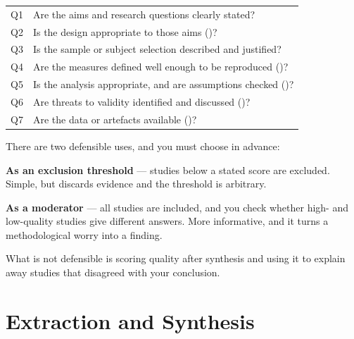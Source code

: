 \begin{center}
\small
\begin{tabular}{@{}L{0.6cm}L{13.8cm}@{}}
\toprule
Q1 & Are the aims and research questions clearly stated? \\
Q2 & Is the design appropriate to those aims ()? \\
Q3 & Is the sample or subject selection described and justified? \\
Q4 & Are the measures defined well enough to be reproduced
     ()? \\
Q5 & Is the analysis appropriate, and are assumptions checked
     ()? \\
Q6 & Are threats to validity identified and discussed ()? \\
Q7 & Are the data or artefacts available ()? \\
\bottomrule
\end{tabular}
\end{center}

\begin{alertbox}
There are two defensible uses, and you must choose in advance:
\begin{tight}
  \item \textbf{As an exclusion threshold} --- studies below a stated score are
    excluded. Simple, but discards evidence and the threshold is arbitrary.
  \item \textbf{As a moderator} --- all studies are included, and you check
    whether high- and low-quality studies give different answers. More
    informative, and it turns a methodological worry into a finding.
\end{tight}
\medskip
What is not defensible is scoring quality after synthesis and using it to
explain away studies that disagreed with your conclusion.
\end{alertbox}

\section{Extraction and Synthesis}

